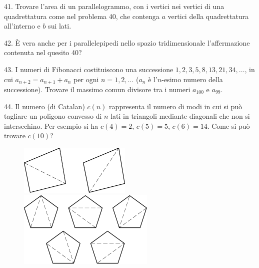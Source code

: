 \begin{problem}{41.}
	Trovare l’area di un parallelogrammo, con i vertici nei vertici di una quadrettatura come nel problema 40, che contenga $a$ vertici della quadrettatura all’interno e $b$ sui lati. 
\end{problem}

\begin{problem}{42.}
	È vera anche per i parallelepipedi nello spazio tridimensionale l’affermazione contenuta nel quesito 40?
\end{problem}

\begin{problem}{43.}
	I numeri di Fibonacci costituiscono una successione $1,2,3,5,8,\allowbreak 13,21,34,\dotsc$, in cui $a_{n+2}=a_{n+1}+a_n$ per ogni
	$n=1,2,\dotsc$ ($a_n$ è l'$n$-esimo numero della successione). Trovare il massimo comun divisore tra i numeri $a_{100}$ e $a_{99}$.
\end{problem}

\begin{problem}{44.}
	Il numero (di Catalan) $c(n)$ rappresenta il numero di modi in cui  si può tagliare un poligono convesso di  $n$ lati in triangoli mediante diagonali che non si intersechino.
 Per esempio si ha $c(4)=2$, $c(5)=5$, $c(6)=14$. Come si può trovare $c(10)$?
	\begin{figure}
		\includegraphics{resources/taskbook-281}
		\qquad
		\includegraphics{resources/taskbook-282}
	\end{figure}
\end{problem}


